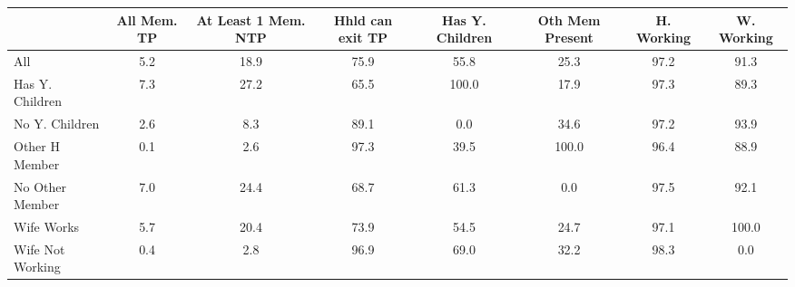 \begin{tabular}{l*{7}{c}}
\hline\hline
            & All Mem. TP&At Least 1 Mem. NTP&Hhld can exit TP&Has Y. Children&Oth Mem Present&  H. Working&  W. Working\\
\hline
All         &         5.2&        18.9&        75.9&        55.8&        25.3&        97.2&        91.3\\
Has Y. Children&         7.3&        27.2&        65.5&       100.0&        17.9&        97.3&        89.3\\
No Y. Children&         2.6&         8.3&        89.1&         0.0&        34.6&        97.2&        93.9\\
Other H Member&         0.1&         2.6&        97.3&        39.5&       100.0&        96.4&        88.9\\
No Other Member&         7.0&        24.4&        68.7&        61.3&         0.0&        97.5&        92.1\\
Wife Works  &         5.7&        20.4&        73.9&        54.5&        24.7&        97.1&       100.0\\
Wife Not Working&         0.4&         2.8&        96.9&        69.0&        32.2&        98.3&         0.0\\
\hline\hline
\end{tabular}
